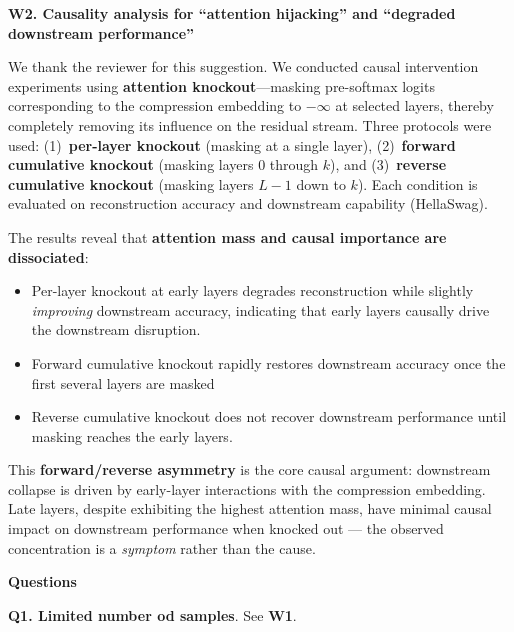 \textbf{W2. Causality analysis for ``attention hijacking'' and ``degraded downstream performance''}



We thank the reviewer for this suggestion. We conducted causal intervention experiments
using \textbf{attention knockout}---masking pre-softmax logits corresponding to the
compression embedding to $-\infty$ at selected layers, thereby completely removing its
influence on the residual stream. Three protocols were used: (1)~\textbf{per-layer knockout}
(masking at a single layer), (2)~\textbf{forward cumulative knockout} (masking layers
$0$ through $k$), and (3)~\textbf{reverse cumulative knockout} (masking layers $L{-}1$
down to $k$). Each condition is evaluated on reconstruction accuracy and downstream
capability (HellaSwag).

The results reveal that \textbf{attention mass and causal importance are dissociated}:
\begin{itemize}
    \item Per-layer knockout at early layers degrades reconstruction while slightly
          \emph{improving} downstream accuracy, indicating that early layers causally
          drive the downstream disruption.
    \item Forward cumulative knockout rapidly restores downstream accuracy once the
          first several layers are masked
    \item Reverse cumulative knockout does not recover
          downstream performance until masking reaches the early layers.
\end{itemize}

This \textbf{forward/reverse asymmetry} is the core causal argument: downstream collapse
is driven by early-layer interactions with the compression embedding. Late layers, despite
exhibiting the highest attention mass, have minimal causal impact on downstream performance
when knocked out --- the observed concentration is a \emph{symptom} rather than the cause.

\textbf{Questions}

\textbf{Q1. Limited number od samples}. See \textbf{W1}.

